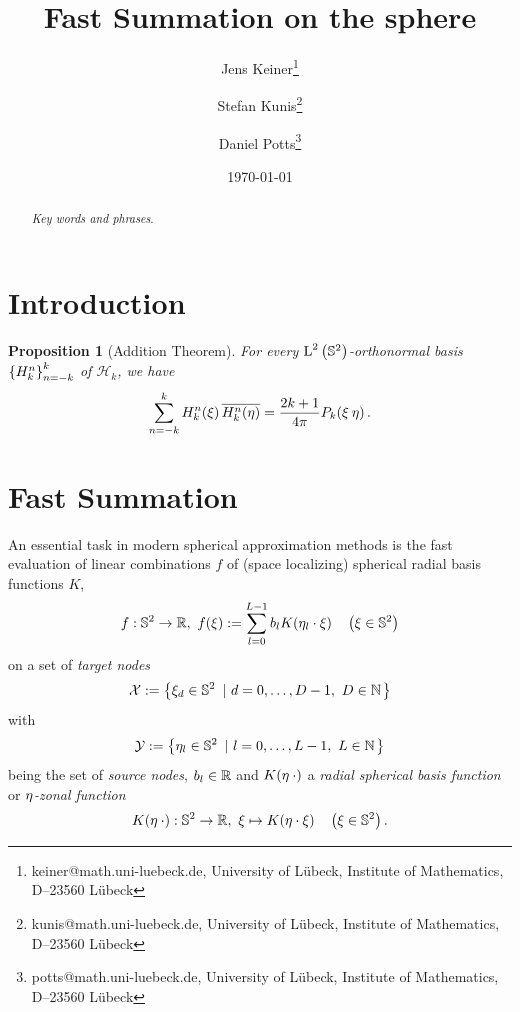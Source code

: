 \documentclass[11pt,a4paper,twoside,bibtotoc]{scrartcl}
\title{
Fast Summation on the sphere}
\date{\today}
\author{
Jens Keiner\thanks{keiner@math.uni-luebeck.de, University of
  L\"ubeck, Institute of Mathematics, D--23560 L\"ubeck} \and
Stefan Kunis\thanks{kunis@math.uni-luebeck.de, University of
  L\"ubeck, Institute of Mathematics, D--23560 L\"ubeck} \and
  Daniel Potts\thanks{potts@math.uni-luebeck.de, University of
  L\"ubeck, Institute of Mathematics, D--23560 L\"ubeck} 
}
\theoremstyle{plain}
\newtheorem{proposition}[theorem]{Proposition}
\theoremstyle{definition}
\theoremstyle{remark}
\numberwithin{equation}{section}
\numberwithin{table}{section}
\numberwithin{figure}{section}
\begin{document}
\maketitle

\begin{abstract}
\medskip


\noindent
{\it Key words and phrases}.  
\end{abstract}

\section{Introduction}
\label{sect:1}

\begin{proposition}[Addition Theorem]
  \label{Basics:AdditionTheorem}
  For every $\text{\rm{L}}^{2}\left(\mathbb{S}^2\right)$-orthonormal basis 
  $\left\{H_{k}^n\right\rbrace_{n=-k}^{k}$ of $\mathcal{H}_k$, we have
  \begin{equation}
    \nonumber
    \sum_{n=-k}^{k} H_{k}^n{\hspace{-0.4ex}}\left(\mathbf{\xi}\right) \overline{H_{k}^n{\hspace{-0.4ex}}\left(\mathbf{\eta}\right)} =
    \frac{2k+1}{4\pi}P_k{\hspace{-0.4ex}}\left(\mathbf{\xi} \: \mathbf{\eta}\right).
  \end{equation}
\end{proposition}


\section{Fast Summation}

An essential task in modern spherical approximation methods is the fast evaluation of linear combinations $f$ of (space localizing) spherical radial basis functions $K$,  
\begin{equation}
  \label{Applications:KernelSum}
  f: \mathbb{S}^2 \rightarrow \mathbb{R},\ f{\hspace{-0.4ex}}\left(\xi\right) := \sum_{l = 0}^{L-1} 
    b_{l} K{\hspace{-0.4ex}}\left(\mathbf{\eta}_{l} \cdot \mathbf{\xi}\right) \quad \left(\mathbf{\xi} \in \mathbb{S}^2\right)
\end{equation}
on a set of \emph{target nodes} 
$$
  \mathcal{X} := \left\{\mathbf{\xi}_{d} \in \mathbb{S}^2\ \left|\ d=0,\ldots,D-1,\ D \in \mathbb{N}\right.\right\rbrace
$$ 
with 
$$
  \mathcal{Y} := \left\{\mathbf{\eta}_{l} \in \mathbb{S}^2\ \left|\ l = 0,\ldots,L-1,\ L \in \mathbb{N}\right.\right\rbrace
$$
being the set of \emph{source nodes}, $b_{l} \in \mathbb{R}$ and $K{\hspace{-0.4ex}}\left(\mathbf{\eta} \: \cdot\right)$ a \emph{radial spherical basis function} or \emph{$\mathbf{\eta}$-zonal function} 
\[
  K{\hspace{-0.4ex}}\left(\mathbf{\eta} \: \cdot\right): \mathbb{S}^2 \rightarrow \mathbb{R},\ \mathbf{\xi} \mapsto K{\hspace{-0.4ex}}\left(\mathbf{\eta} \cdot \mathbf{\xi}\right) \quad \left(\mathbf{\xi} \in \mathbb{S}^2\right).\]
\end{document}
